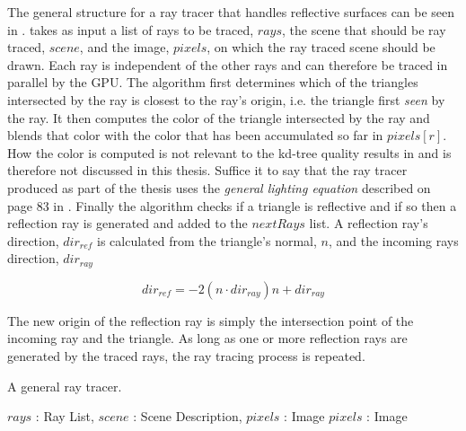 The general structure for a ray tracer that handles reflective surfaces can be
seen in .  takes as
input a list of rays to be traced, $rays$, the scene that should be ray traced,
$scene$, and the image, $pixels$, on which the ray traced scene should be
drawn. Each ray is independent of the other rays and can therefore be traced in
parallel by the GPU. The algorithm first determines which of the triangles
intersected by the ray is closest to the ray's origin, i.e. the triangle first
\textit{seen} by the ray. It then computes the color of the triangle intersected
by the ray and blends that color with the color that has been accumulated so far
in $pixels[r]$. How the color is computed is not relevant to the kd-tree quality
results in  and is therefore not discussed in this
thesis. Suffice it to say that the ray tracer produced as part of the thesis
uses the \textit{general lighting equation} described on page 83 in
. Finally the algorithm checks if a triangle is reflective and if
so then a reflection ray is generated and added to the $nextRays$ list. A
reflection ray's direction, $dir_{ref}$ is calculated from the triangle's
normal, $n$, and the incoming rays direction, $dir_{ray}$

\begin{displaymath}
  dir_{ref} = -2 (n \cdot dir_{ray}) n + dir_{ray}
\end{displaymath}

The new origin of the reflection ray is simply the intersection point of the
incoming ray and the triangle. As long as one or more reflection rays are
generated by the traced rays, the ray tracing process is repeated.

\begin{algorithm}
  \caption{A general ray tracer.}
  \label{alg:generalRayTracer}
  \begin{algorithmic}
              {$rays$ : Ray List, $scene$ : Scene Description, $pixels$ : Image}
              {$pixels$ : Image}{
                  \ENDIF
                \ENDFOR
                \ENDIF
              }
  \end{algorithmic}
\end{algorithm}

